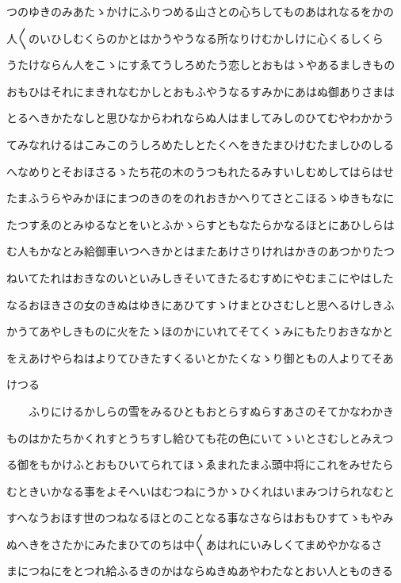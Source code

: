 \documentclass[a4paper,11pt,landscape]{ltjtarticle}
\begin{document}
\par\medskip
つのゆきのみあたゝかけにふりつめる山さとの心ちしてものあはれなるをかの
\par\medskip
人〱のいひしむくらのかとはかうやうなる所なりけむかしけに心くるしくら
\par\medskip
うたけならん人をこゝにすゑてうしろめたう恋しとおもはゝやあるましきもの
\par\medskip
おもひはそれにまきれなむかしとおもふやうなるすみかにあはぬ御ありさまは
\par\medskip
とるへきかたなしと思ひなからわれならぬ人はましてみしのひてむやわかかう
\par\medskip
てみなれけるはこみこのうしろめたしとたくへをきたまひけむたましひのしる
\par\medskip
へなめりとそおほさるゝたち花の木のうつもれたるみすいしむめしてはらはせ
\par\medskip
たまふうらやみかほにまつのきのをのれおきかへりてさとこほるゝゆきもなに
\par\medskip
たつすゑのとみゆるなとをいとふかゝらすともなたらかなるほとにあひしらは
\par\medskip
む人もかなとみ給御車いつへきかとはまたあけさりけれはかきのあつかりたつ
\par\medskip
ねいてたれはおきなのいといみしきそいてきたるむすめにやむまこにやはした
\par\medskip
なるおほきさの女のきぬはゆきにあひてすゝけまとひさむしと思へるけしきふ
\par\medskip
かうてあやしきものに火をたゝほのかにいれてそてくゝみにもたりおきなかと
\par\medskip
をえあけやらねはよりてひきたすくるいとかたくなゝり御ともの人よりてそあ
\par\medskip
けつる
\par\medskip
　　ふりにけるかしらの雪をみるひともおとらすぬらすあさのそてかなわかき
\par\medskip
ものはかたちかくれすとうちすし給ひても花の色にいてゝいとさむしとみえつ
\par\medskip
る御をもかけふとおもひいてられてほゝゑまれたまふ頭中将にこれをみせたら
\par\medskip
むときいかなる事をよそへいはむつねにうかゝひくれはいまみつけられなむと
\par\medskip
すへなうおほす世のつねなるほとのことなる事なさならはおもひすてゝもやみ
\par\medskip
ぬへきをさたかにみたまひてのちは中〱あはれにいみしくてまめやかなるさ
\par\medskip
まにつねにをとつれ給ふるきのかはならぬきぬあやわたなとおい人とものきる
\end{document}
